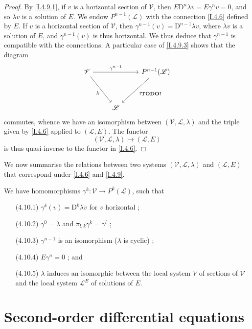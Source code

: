 \documentclass{report}
\theoremstyle{plain}
\theoremstyle{definition}
\newenvironment{env}[1]
    {\renewcommand\theinnercustomenv{#1}\innercustomenv}
    {\endinnercustomenv}
\newcommand{\sh}{\mathscr}
\newcommand{\DD}{\mathrm{D}}
\newcommand{\todo}{\textbf{ !TODO! }}
\newcommand{\oldpage}[1]{\marginpar{\footnotesize$\Big\vert$ \textit{p.~#1}}}
\begin{document}
\begin{proof}
  By \cref{I.4.9.1}, if $v$ is a horizontal section of $\sh{V}$, then $E\DD^n\lambda v = E\gamma^n v = 0$, and so $\lambda v$ is a solution of $E$.
  We endow $P^{n-1}(\sh{L})$ with the connection \cref{I.4.6} defined by $E$.
  If $v$ is a horizontal section of $\sh{V}$, then $\gamma^{n-1}(v)=\DD^{n-1}\lambda v$, where $\lambda v$ is a solution of $E$, and $\gamma^{n-1}(v)$ is thus horizontal.
  We thus deduce that $\gamma^{n-1}$ is compatible with the connections.
  A particular case of \cref{I.4.9.3} shows that the diagram
  \[
    \begin{tikzcd}[row sep=huge]
      \sh{V} \ar[rr,"\gamma^{n-1}"] \drar[swap,"\lambda"]
      && P^{n-1}(\sh{L}) \dlar["\todo"]
    \\&\sh{L}&
    \end{tikzcd}
  \]
  commutes, whence we have an isomorphism between $(\sh{V},\sh{L},\lambda)$ and the triple given by \cref{I.4.6} applied to $(\sh{L},E)$.
  The functor
  \[
    (\sh{V},\sh{L},\lambda) \mapsto (\sh{L},E)
  \]
  is thus quasi-inverse to the functor in \cref{I.4.6}.
\end{proof}

\begin{env}{4.10}
\label{I.4.10}
  We now summarise the relations between two systems $(\sh{V},\sh{L},\lambda)$ and $(\sh{L},E)$ that correspond under \cref{I.4.6} and \cref{I.4.9}.

  We have homomorphisms $\gamma^k\colon\sh{V}\to P^k(\sh{L})$, such that
  \begin{enumerate}
    \item[(4.10.1)]\label{I.4.10.1}
      $\gamma^k(v) = \DD^k\lambda v$ for $v$ horizontal ;
\oldpage{29}
    \item[(4.10.2)]\label{I.4.10.2}
      $\gamma^0=\lambda$ and $\pi_{l,k}\gamma^k=\gamma^l$ ;
    \item[(4.10.3)]\label{I.4.10.3}
      $\gamma^{n-1}$ is an isomorphism ($\lambda$ is cyclic) ;
    \item[(4.10.4)]\label{I.4.10.4}
      $E\gamma^n=0$ ; and
    \item[(4.10.5)]\label{I.4.10.5}
      $\lambda$ induces an isomorphic between the local system $V$ of sections of $\sh{V}$ and the local system $\sh{L}^E$ of solutions of $E$.
  \end{enumerate}
\end{env}


\section{Second-order differential equations}
\label{I.5}
\end{document}
